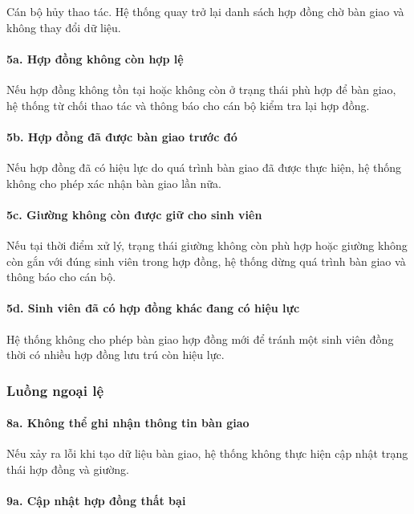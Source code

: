 Cán bộ hủy thao tác. Hệ thống quay trở lại danh sách hợp đồng chờ bàn giao và không thay đổi dữ liệu.

\paragraph{5a. Hợp đồng không còn hợp lệ}

Nếu hợp đồng không tồn tại hoặc không còn ở trạng thái phù hợp để bàn giao, hệ thống từ chối thao tác và thông báo cho cán bộ kiểm tra lại hợp đồng.

\paragraph{5b. Hợp đồng đã được bàn giao trước đó}

Nếu hợp đồng đã có hiệu lực do quá trình bàn giao đã được thực hiện, hệ thống không cho phép xác nhận bàn giao lần nữa.

\paragraph{5c. Giường không còn được giữ cho sinh viên}

Nếu tại thời điểm xử lý, trạng thái giường không còn phù hợp hoặc giường không còn gắn với đúng sinh viên trong hợp đồng, hệ thống dừng quá trình bàn giao và thông báo cho cán bộ.

\paragraph{5d. Sinh viên đã có hợp đồng khác đang có hiệu lực}

Hệ thống không cho phép bàn giao hợp đồng mới để tránh một sinh viên đồng thời có nhiều hợp đồng lưu trú còn hiệu lực.

\subsubsection{Luồng ngoại lệ}

\paragraph{8a. Không thể ghi nhận thông tin bàn giao}

Nếu xảy ra lỗi khi tạo dữ liệu bàn giao, hệ thống không thực hiện cập nhật trạng thái hợp đồng và giường.

\paragraph{9a. Cập nhật hợp đồng thất bại}

